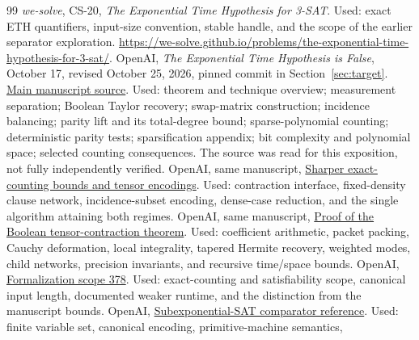 \documentclass[11pt,a4paper]{article}
\numberwithin{equation}{section}
\theoremstyle{definition}
\theoremstyle{remark}
\begin{document}
\begin{thebibliography}{99}
 \emph{we-solve}, CS-20,
\emph{The Exponential Time Hypothesis for 3-SAT}.
Used: exact ETH quantifiers, input-size convention, stable handle, and the
scope of the earlier separator exploration.
\url{https://we-solve.github.io/problems/the-exponential-time-hypothesis-for-3-sat/}.
 OpenAI, \emph{The Exponential Time Hypothesis is False},
October 17, revised October 25, 2026, pinned commit in Section~\ref{sec:target}.
\href{https://github.com/openai/math/blob/7ef5c0cc5ca4b0e072b7a050fca09ab24bc6fa3a/preprints/The-Exponential-Time-Hypothesis-is-False-October-25-2026/build/main_full_version.tex}{Main manuscript source}.
Used: theorem and technique overview; measurement separation; Boolean Taylor
recovery; swap-matrix construction; incidence balancing; parity lift and its
total-degree bound; sparse-polynomial counting; deterministic parity tests;
sparsification appendix; bit complexity and polynomial space; selected
counting consequences. The source was read for this exposition, not fully
independently verified.
 OpenAI, same manuscript,
\href{https://github.com/openai/math/blob/7ef5c0cc5ca4b0e072b7a050fca09ab24bc6fa3a/preprints/The-Exponential-Time-Hypothesis-is-False-October-25-2026/build/quantitative-reduction.tex}{Sharper exact-counting bounds and tensor encodings}.
Used: contraction interface, fixed-density clause network, incidence-subset
encoding, dense-case reduction, and the single algorithm attaining both regimes.
 OpenAI, same manuscript,
\href{https://github.com/openai/math/blob/7ef5c0cc5ca4b0e072b7a050fca09ab24bc6fa3a/preprints/The-Exponential-Time-Hypothesis-is-False-October-25-2026/build/quantitative-contraction.tex}{Proof of the Boolean tensor-contraction theorem}.
Used: coefficient arithmetic, packet packing, Cauchy deformation, local
integrality, tapered Hermite recovery, weighted modes, child networks,
precision invariants, and recursive time/space bounds.
 OpenAI,
\href{https://github.com/openai/math/blob/7ef5c0cc5ca4b0e072b7a050fca09ab24bc6fa3a/lean/docs/378.md}{Formalization scope 378}.
Used: exact-counting and satisfiability scope, canonical input length,
documented weaker runtime, and the distinction from the manuscript bounds.
 OpenAI,
\href{https://github.com/openai/math/blob/7ef5c0cc5ca4b0e072b7a050fca09ab24bc6fa3a/lean/ComparatorChallenges/SubexponentialSAT.lean}{Subexponential-SAT comparator reference}.
Used: finite variable set, canonical encoding, primitive-machine semantics,

\end{thebibliography}
\end{document}
